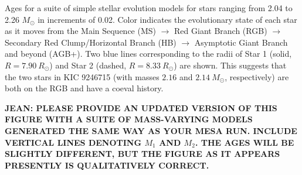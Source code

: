 \label{fig:mesa} Ages for a suite of simple stellar evolution models for stars ranging from 2.04 to 2.26 $M_{\odot}$ in increments of 0.02. Color indicates the evolutionary state of each star as it moves from the Main Sequence (MS) $\rightarrow$ Red Giant Branch (RGB) $\rightarrow$ Secondary Red Clump/Horizontal Branch (HB) $\rightarrow$ Asymptotic Giant Branch and beyond (AGB+). Two blue lines corresponding to the radii of Star 1 (solid, $R = 7.90 \ R_\odot$) and Star 2 (dashed, $R = 8.33 \ R_\odot$) are shown. This suggests that the two stars in KIC 9246715 (with masses $2.16$ and $2.14 \ M_\odot$, respectively) are both on the RGB and have a coeval history.

\textbf{JEAN: PLEASE PROVIDE AN UPDATED VERSION OF THIS FIGURE WITH A SUITE OF MASS-VARYING MODELS GENERATED THE SAME WAY AS YOUR  MESA RUN. INCLUDE VERTICAL LINES DENOTING $M_1$ AND $M_2$. THE AGES WILL BE SLIGHTLY DIFFERENT, BUT THE FIGURE AS IT APPEARS PRESENTLY IS QUALITATIVELY CORRECT.}
  
  
  
  